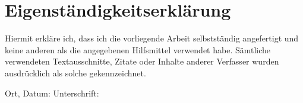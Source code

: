 \newpage
\section*{Eigenständigkeitserklärung}
Hiermit erkläre ich, dass ich die vorliegende Arbeit selbstständig angefertigt und keine anderen als die
angegebenen Hilfsmittel verwendet habe. Sämtliche verwendeten Textausschnitte, Zitate oder Inhalte anderer Verfasser wurden ausdrücklich als solche gekennzeichnet.\\
\vspace{10cm}

Ort, Datum: \hspace{8cm} Unterschrift:


\newpage